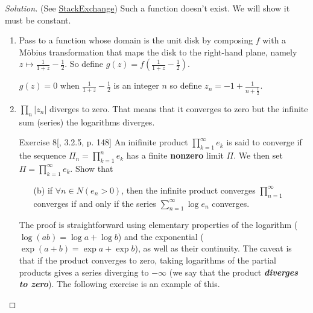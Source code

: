 \begin{proof}[Solution]\leavevmode 
	(See \href{https://math.stackexchange.com/questions/380446/prove-that-a-bounded-analytic-function-in-the-right-half-plane-which-vanishes-at}{StackExchange}) Such a function doesn't exist. We will show it must be constant.
\begin{enumerate}[label=\textbf{Step \arabic*}]
		\item Pass to a function whose domain is the unit disk by composing $f$ with a M\"obius transformation that maps the disk to the right-hand plane, namely $z\mapsto \frac{1}{1+z}-\frac{1}{2}$. So define $g(z)=f\left( \frac{1}{1+z}-\frac{1}{2} \right) $.

	$g(z)=0$ when $\frac{1}{1+z}-\frac{1}{2}$ is an integer $n$ so define $z_{n}=-1+\frac{1}{n+\frac{1}{2}}$.

		\item $\prod_{n} |z_{n}| $ diverges to zero. That means that it converges to zero but the infinite sum (series) the logarithms diverges.
\clearpage
\begin{thing4}{Exercise 8}[\cite{zo1}, 3.2.5, p. 148]\leavevmode
An inifinite product $\prod_{k=1}^\infty e_k$ is said to converge if the sequence $\Pi_n=\prod_{k=1}^n e_k$ has a finite \textbf{nonzero} limit $\Pi$. We then set $\Pi=\prod_{k=1}^\infty e_k$. Show that
\begin{enumerate}[label=(\alph*)]
	\item[(b)]  if $\forall n \in N (e_n>0)$, then the infinite product converges $\prod_{n=1}^\infty$ converges if and only if the series  $\sum_{n=1}^\infty \operatorname{log}e_n$ converges.
\end{enumerate}
\end{thing4}

\begin{remark}\leavevmode
The proof is straightforward using elementary properties of the logarithm ($\operatorname{log}(ab)=\operatorname{log}a+\operatorname{log}b$) and the exponential ($\operatorname{exp}(a+b)=\operatorname{exp}a+\operatorname{exp}b$), as well as their continuity. The caveat is that if the product converges to zero, taking logarithms of the partial products gives a series diverging to $-\infty$ (we say that the product \textit{\textbf{diverges to zero}}). The following exercise is an example of this.
\end{remark}


\end{enumerate}
\end{proof}

